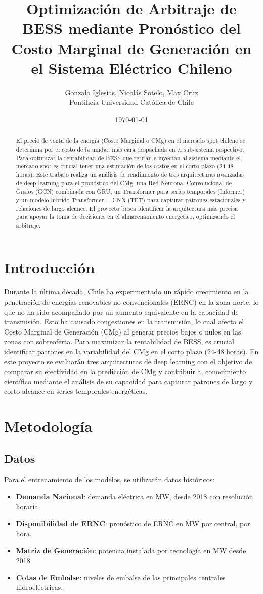 \documentclass[twocolumn]{article}
\title{Optimización de Arbitraje de BESS mediante Pronóstico del Costo Marginal de Generación en el Sistema Eléctrico Chileno}
\author{Gonzalo Iglesias, Nicolás Sotelo, Max Cruz  \\
	Pontificia Universidad Católica de Chile  \\
	}
\date{\today}
\begin{document}
\maketitle

\begin{abstract}
El precio de venta de la energía (Costo Marginal o CMg) en el mercado spot chileno se determina por el costo de la unidad más cara despachada en el sub-sistema respectivo. Para optimizar la rentabilidad de BESS que retiran e inyectan al sistema mediante el mercado spot es crucial tener una estimación de los costos en el corto plazo (24-48 horas). Este trabajo realiza un análisis de rendimiento de tres arquitecturas avanzadas de deep learning para el pronóstico del CMg: una Red Neuronal Convolucional de Grafos (GCN) combinada con GRU, un Transformer para series temporales (Informer) y un modelo híbrido Transformer + CNN (TFT) para capturar patrones estacionales y relaciones de largo alcance. El proyecto busca identificar la arquitectura más precisa para apoyar la toma de decisiones en el almacenamiento energético, optimizando el arbitraje.
\end{abstract}

\section{Introducción}
Durante la última década, Chile ha experimentado un rápido crecimiento en la penetración de energías renovables no convencionales (ERNC) en la zona norte, lo que no ha sido acompañado por un aumento equivalente en la capacidad de transmisión. Esto ha causado congestiones en la transmisión, lo cual afecta el Costo Marginal de Generación (CMg) al generar precios bajos o nulos en las zonas con sobreoferta. Para maximizar la rentabilidad de BESS, es crucial identificar patrones en la variabilidad del CMg en el corto plazo (24-48 horas). En este proyecto se evaluarán tres arquitecturas de deep learning con el objetivo de comparar su efectividad en la predicción de CMg y contribuir al conocimiento científico mediante el análisis de su capacidad para capturar patrones de largo y corto alcance en series temporales energéticas.

\section{Metodología}
\subsection{Datos}
Para el entrenamiento de los modelos, se utilizarán datos históricos:
\begin{itemize}
    \item \textbf{Demanda Nacional}: demanda eléctrica en MW, desde 2018 con resolución horaria.
    \item \textbf{Disponibilidad de ERNC}: pronóstico de ERNC en MW por central, por hora.
    \item \textbf{Matriz de Generación}: potencia instalada por tecnología en MW desde 2018.
    \item \textbf{Cotas de Embalse}: niveles de embalse de las principales centrales hidroeléctricas.
\end{itemize}
\end{document}
